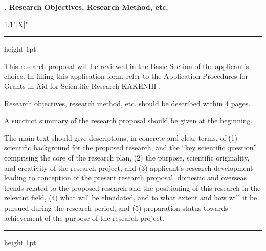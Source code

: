 \documentclass[8pt]{extarticle}
\makeatletter
\newcommand{\thickhline}{%
	\noalign {\ifnum 0=`}\fi \hrule height 1pt
	\futurelet \reserved@a \@xhline
}
\makeatother
\begin{document}
	
\noindent\textbf{\fontsize{12}{12}. Research Objectives, Research Method, etc.}\\
\begin{tabularx}{1.1\linewidth}{"|X|"}
	\thickhline
	This research proposal will be reviewed in the Basic Section of the applicant's choice. In filling this application form, refer to the Application Procedures for Grants-in-Aid for Scientific Research-KAKENHI-.
	
	Research objectives, research method, etc. should be described within 4 pages.
	
	A succinct summary of the research proposal should be given at the beginning. 
	
	The main text should give descriptions, in concrete and clear terms, of (1) scientific background for the proposed research, and the ``key scientific question'' comprising the core of the research plan, (2) the purpose, scientific originality, and creativity of the research project, and (3) applicant's research development leading to conception of the present research proposal, domestic and overseas trends related to the proposed research and the positioning of this research in the relevant field, (4) what will be elucidated, and to what extent and how will it be pursued during the research period, and (5) preparation status towards achievement of the purpose of the research project.
	\\
	\thickhline
\end{tabularx}
\end{document}
